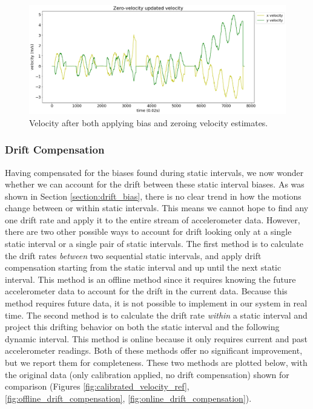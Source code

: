\documentclass{article}
\begin{document}
      \begin{figure}[H]
        \centering
        \includegraphics[width=1\linewidth]{./images/zeroed-velocity.png}
        \caption{Velocity after both applying bias and zeroing velocity estimates.}
        \label{fig:zeroed_velocity}
      \end{figure}

    \subsubsection{Drift Compensation}

      Having compensated for the biases found during static intervals, we now wonder whether we can account for the drift between these static interval biases. As was shown in Section \ref{section:drift_bias}, there is no clear trend in how the motions change between or within static intervals. This means we cannot hope to find any one drift rate and apply it to the entire stream of accelerometer data. However, there are two other possible ways to account for drift looking only at a single static interval or a single pair of static intervals. The first method is to calculate the drift rates \textit{between} two sequential static intervals, and apply drift compensation starting from the static interval and up until the next static interval. This method is an offline method since it requires knowing the future accelerometer data to account for the drift in the current data. Because this method requires future data, it is not possible to implement in our system in real time. The second method is to calculate the drift rate \textit{within} a static interval and project this drifting behavior on both the static interval and the following dynamic interval. This method is online because it only requires current and past accelerometer readings. Both of these methods offer no significant improvement, but we report them for completeness. These two methods are plotted below, with the original data (only calibration applied, no drift compensation) shown for comparison (Figures \ref{fig:calibrated_velocity_ref}, \ref{fig:offline_drift_compensation}, \ref{fig:online_drift_compensation}).
\end{document}

